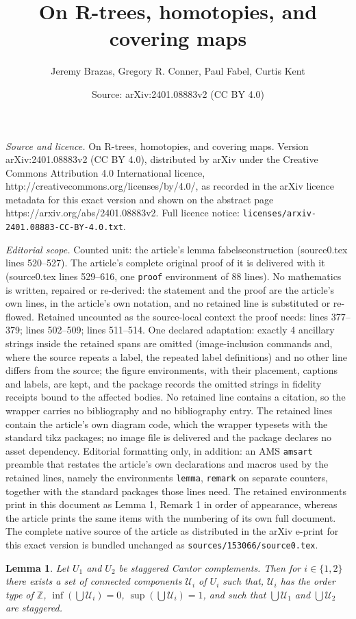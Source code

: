 \documentclass[10pt,a4paper]{amsart}
\title{On R-trees, homotopies, and covering maps}
\author{Jeremy Brazas, Gregory R. Conner, Paul Fabel, Curtis Kent}
\date{Source: arXiv:2401.08883v2 (CC BY 4.0)}
\newtheorem{lemma}{Lemma}
\newcommand{\bbz}{\mathbb{Z}}
\newcommand{\scru}{\mathscr{U}}
\begin{document}
\maketitle

\noindent\emph{Source and licence.} On R-trees, homotopies, and covering maps. Version arXiv:2401.08883v2 (CC BY 4.0), distributed by arXiv under the Creative Commons Attribution 4.0 International licence, http://creativecommons.org/licenses/by/4.0/, as recorded in the arXiv licence metadata for this exact version and shown on the abstract page https://arxiv.org/abs/2401.08883v2. Full licence notice: \texttt{licenses/arxiv-2401.08883-CC-BY-4.0.txt}.\par\smallskip

\noindent\textit{Editorial scope.} Counted unit: the article's lemma fabelsconstruction (source0.tex lines 520--527). The article's complete original proof of it is delivered with it (source0.tex lines 529--616, one \texttt{proof} environment of 88 lines). No mathematics is written, repaired or re-derived: the statement and the proof are the article's own lines, in the article's own notation, and no retained line is substituted or re-flowed.  Retained uncounted as the source-local context the proof needs: lines 377--379; lines 502--509; lines 511--514.  One declared adaptation: exactly 4 ancillary strings inside the retained spans are omitted (image-inclusion commands and, where the source repeats a label, the repeated label definitions) and no other line differs from the source; the figure environments, with their placement, captions and labels, are kept, and the package records the omitted strings in fidelity receipts bound to the affected bodies.  No retained line contains a citation, so the wrapper carries no bibliography and no bibliography entry.  The retained lines contain the article's own diagram code, which the wrapper typesets with the standard tikz packages; no image file is delivered and the package declares no asset dependency.  Editorial formatting only, in addition: an AMS \texttt{amsart} preamble that restates the article's own declarations and macros used by the retained lines, namely the environments \texttt{lemma}, \texttt{remark} on separate counters, together with the standard packages those lines need.  The retained environments print in this document as Lemma 1, Remark 1 in order of appearance, whereas the article prints the same items with the numbering of its own full document.  The complete native source of the article as distributed in the arXiv e-print for this exact version is bundled unchanged as \texttt{sources/153066/source0.tex}.
\begin{lemma}\label{choosezsetlemma}
Let $U_1$ and $U_2$ be staggered Cantor complements. Then for $i\in\{1,2\}$ there exists a set of connected components $\scru_i$ of $U_i$ such that, $\scru_i$ has the order type of $\bbz$, $\inf(\bigcup\scru_i)=0$, $\sup(\bigcup\scru_i)=1$, and such that $\bigcup\scru_1$ and $\bigcup\scru_2$ are staggered.
\end{lemma}
\end{document}
